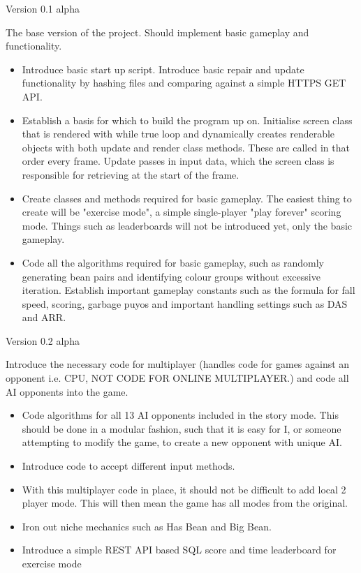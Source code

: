 \documentclass{article}
\begin{document}
Version 0.1 alpha

The base version of the project. Should implement basic gameplay and functionality.
\begin{itemize}
    \renewcommand\labelitemi{--}
    \item Introduce basic start up script. Introduce basic repair and update functionality by hashing files and comparing against a simple HTTPS GET API.
    \item Establish a basis for which to build the program up on. Initialise screen class that is rendered with while true loop and dynamically creates renderable objects with both update and render class methods. These are called in that order every frame. Update passes in input data, which the screen class is responsible for retrieving at the start of the frame.
    \item Create classes and methods required for basic gameplay. The easiest thing to create will be "exercise mode", a simple single-player "play forever" scoring mode. Things such as leaderboards will not be introduced yet, only the basic gameplay.
    \item Code all the algorithms required for basic gameplay, such as randomly generating bean pairs and identifying colour groups without excessive iteration. Establish important gameplay constants such as the formula for fall speed, scoring, garbage puyos and important handling settings such as DAS and ARR.
\end{itemize}

Version 0.2 alpha

Introduce the necessary code for multiplayer (handles code for games against an opponent i.e. CPU, NOT CODE FOR ONLINE MULTIPLAYER.) and code all AI opponents into the game.
\begin{itemize}
    \renewcommand\labelitemi{--}
    \item Code algorithms for all 13 AI opponents included in the story mode. This should be done in a modular fashion, such that it is easy for I, or someone attempting to modify the game, to create a new opponent with unique AI.
    \item Introduce code to accept different input methods.
    \item With this multiplayer code in place, it should not be difficult to add local 2 player mode. This will then mean the game has all modes from the original.
    \item Iron out niche mechanics such as Has Bean and Big Bean.
    \item Introduce a simple REST API based SQL score and time leaderboard for exercise mode
\end{itemize}
\end{document}
